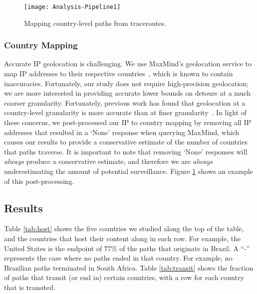 \begin{figure}[t]
\centering
\texttt{[image: Analysis-Pipeline1]}
\caption{Mapping country-level paths from traceroutes.}
\label{fig:analysis_pipeline}
\end{figure}


\subsubsection{Country Mapping}
\label{c_map}

Accurate IP geolocation is challenging. We use MaxMind's
geolocation service to map IP addresses to their respective
countries~\cite{maxmind}, which is known to contain inaccuracies.
Fortunately, our study does not require high-precision geolocation; we
are more interested in providing accurate lower bounds on detours at a
much coarser granularity.  Fortunately, previous work has found that
geolocation at a country-level granularity is more accurate than at
finer granularity~\cite{huffaker2011geocompare}.  In light of these
concerns, we post-processed our IP to country mapping
by removing all IP addresses that resulted in a `None' response when
querying MaxMind, which causes our results to provide a conservative
estimate of the number of countries that paths traverse. It is important
to note that removing `None' responses will \textit{always} produce a
conservative estimate, and therefore we are \textit{always}
underestimating the amount of potential surveillance.  
Figure \ref{fig:analysis_pipeline} shows an example of this
post-processing. 

\subsection{Results}



Table \ref{tab:host} shows the five countries we studied along the top
of the table, and the countries that host their content along in each
row.  For example, the United States is the endpoint of 77\% of the
paths that originate in Brazil.  A ``-'' represents the case where no
paths ended in that country.  For example, no Brazilian paths terminated in
South Africa. Table \ref{tab:transit} shows the fraction of paths that
transit (or end in) certain countries, with a row for each country that is transited.

